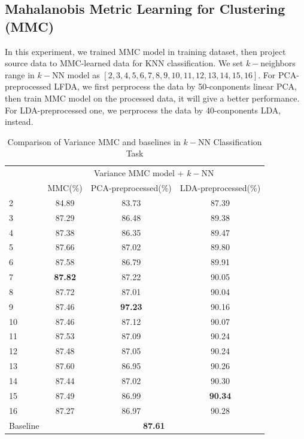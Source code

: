 \documentclass[conference]{IEEEtran}
\begin{document}
\subsection{Mahalanobis Metric Learning for Clustering (MMC)}
In this experiment, we trained MMC model in training dataset, then project source data to MMC-learned data for KNN classification. We set $k-$neighbors range in $k-$NN model as $[2, 3, 4, 5, 6, 7, 8, 9, 10, 11, 12, 13, 14, 15, 16]$. For PCA-preprocessed LFDA, we first perprocess the data by 50-conponents linear PCA, then train MMC model on the processed data, it will give a better performance. For LDA-preprocessed one, we perprocess the data by 40-conponents LDA, instead.
\begin{table}[htbp]
	\centering
 	\newcommand{\tabincell}[2]{\begin{tabular}{@{}#1@{}}#2\end{tabular}}
 	\renewcommand\arraystretch{1.0}
 	\caption{Comparison of Variance MMC and baselines in $k-$NN Classification Task}
 	\label{base4}%
 		\begin{tabular}{@{}p{1cm}<{\centering}|c|c|c}
 		\hline
 		\multirow{2}{*}{\diagbox[height=2\line,width=1.42cm,font=\tiny]{$k$}{Acc.}{$\mathit{M}$}} &
 		\multicolumn{3}{c}{Variance MMC model + $k-$NN}\\
 		\cline{2-4}
			& MMC(\%) & {PCA-preprocessed(\%)} & {LDA-preprocessed(\%)}\\
 		\hline
 		2   &   84.89&  83.73&87.39 \\
 		3   &   87.29&  86.48&89.38 \\
 		4   &   87.38&  86.35&89.47 \\
 		5   &   87.66&  87.02&89.80 \\
 		6   &   87.58&  86.79&89.91 \\
 		7   & \textbf{87.82}  & 87.22 & 90.05\\
 		8   &   87.72&  87.01&90.04 \\
 		9   &   87.46& \textbf{97.23} &90.16 \\
 		10   &   87.46&  87.12&90.07 \\
 		11   &   87.53&  87.09& 90.24\\
 		12   &   87.48&  87.05&90.24 \\
 		13   &   87.60&  86.95& 90.26\\
 		14   &   87.44&  87.02& 90.30\\
 		15   &   87.49&  86.99& \textbf{90.34}\\
		16   &   87.27&  86.97&90.28 \\  
		\hline
		Baseline & \multicolumn{3}{c}{\textbf{87.61}} \\
 		\hline
		\end{tabular}
\end{table}
\end{document}
